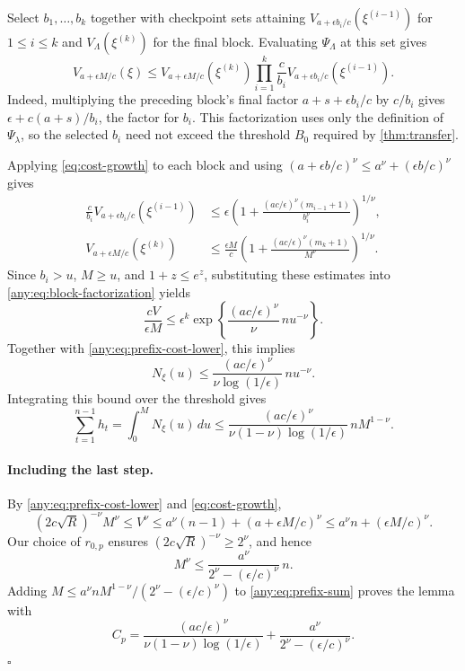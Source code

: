 \documentclass[11pt,letterpaper]{article}
\theoremstyle{definition}
\begin{document}
Select $b_1,\ldots,b_k$ together with checkpoint sets attaining $V_{a+\epsilon b_i/c}(\xi^{(i-1)})$ for $1\le i\le k$ and $V_\Lambda(\xi^{(k)})$ for the final block.
Evaluating $\Psi_\Lambda$ at this set gives
\begin{equation}
    V_{a+\epsilon M/c}(\xi)
    \le V_{a+\epsilon M/c}(\xi^{(k)})
    \prod_{i=1}^k\frac{c}{b_i}
    V_{a+\epsilon b_i/c}(\xi^{(i-1)}).
    \label{any:eq:block-factorization}
\end{equation}
Indeed, multiplying the preceding block's final factor $a+s+\epsilon b_i/c$ by $c/b_i$ gives $\epsilon+c(a+s)/b_i$, the factor for $b_i$.
This factorization uses only the definition of $\Psi_\lambda$, so the selected $b_i$ need not exceed the threshold $B_0$ required by \cref{thm:transfer}.

Applying \eqref{eq:cost-growth} to each block and using $(a+\epsilon b/c)^\nu\le a^\nu+(\epsilon b/c)^\nu$ gives
\begin{align*}
    \frac{c}{b_i}V_{a+\epsilon b_i/c}(\xi^{(i-1)})
    &\le \epsilon\left(
        1+\frac{(ac/\epsilon)^\nu(m_{i-1}+1)}{b_i^\nu}
    \right)^{1/\nu},
    \\
    V_{a+\epsilon M/c}(\xi^{(k)})
    &\le\frac{\epsilon M}{c}\left(
        1+\frac{(ac/\epsilon)^\nu(m_k+1)}{M^\nu}
    \right)^{1/\nu}.
\end{align*}
Since $b_i>u$, $M\ge u$, and $1+z\le e^z$, substituting these estimates into \eqref{any:eq:block-factorization} yields
\[
    \frac{cV}{\epsilon M}
    \le\epsilon^k
    \exp\!\left\{
        \frac{(ac/\epsilon)^\nu}{\nu}\,n u^{-\nu}
    \right\}.
\]
Together with \eqref{any:eq:prefix-cost-lower}, this implies
\begin{equation*}
    N_\xi(u)
    \le\frac{(ac/\epsilon)^\nu}{\nu\log(1/\epsilon)}
    \,n u^{-\nu}.
\end{equation*}
Integrating this bound over the threshold gives
\begin{equation}
    \sum_{t=1}^{n-1}h_t
    =\int_0^M N_\xi(u)\,du
    \le\frac{(ac/\epsilon)^\nu}{\nu(1-\nu)\log(1/\epsilon)}
    \,nM^{1-\nu}.
    \label{any:eq:prefix-sum}
\end{equation}

\paragraph{Including the last step.}
By \eqref{any:eq:prefix-cost-lower} and \eqref{eq:cost-growth},
\[
    (2c\sqrt R)^{-\nu}M^\nu
    \le V^\nu
    \le a^\nu(n-1)+(a+\epsilon M/c)^\nu
    \le a^\nu n+(\epsilon M/c)^\nu.
\]
Our choice of $r_{0,p}$ ensures $(2c\sqrt R)^{-\nu}\ge2^\nu$, and hence
\[
    M^\nu\le\frac{a^\nu}{2^\nu-(\epsilon/c)^\nu}\,n.
\]
Adding $M\le a^\nu nM^{1-\nu}/(2^\nu-(\epsilon/c)^\nu)$ to \eqref{any:eq:prefix-sum} proves the lemma with
\begin{equation*}
    C_p=\frac{(ac/\epsilon)^\nu}{\nu(1-\nu)\log(1/\epsilon)}
        +\frac{a^\nu}{2^\nu-(\epsilon/c)^\nu}.
\end{equation*}
\hfill$\square$
\end{document}
